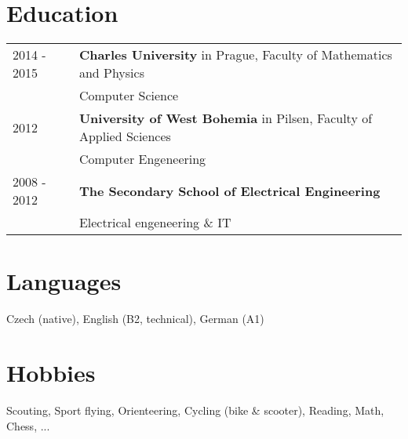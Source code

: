 \documentclass[12pt,a4paper]{article}
\begin{document}
\section*{Education}
\begin{tabular}{@{}p{2cm}l}
2014 - 2015 & {\bf Charles University} in Prague, Faculty of Mathematics and Physics\\
 & Computer Science\\
2012  & {\bf University of West Bohemia} in Pilsen, Faculty of Applied Sciences\\
 & Computer Engeneering\\
2008 - 2012 & {\bf The Secondary School of Electrical Engineering}\\
 & Electrical engeneering \& IT\\
\end{tabular}

\section*{Languages}
Czech (native), English (B2, technical), German (A1)\\

\section*{Hobbies}
Scouting, Sport flying, Orienteering, Cycling (bike \& scooter), Reading, Math, Chess, ...
\\
\end{document}

